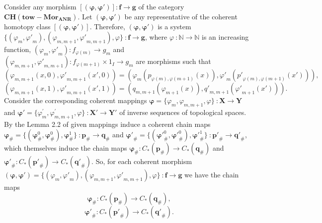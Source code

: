 \documentclass[10pt]{article}
\theoremstyle{definition}
\begin{document}
Consider any morphism $\left[ ( \mathbf{\varphi },\mathbf{{\varphi }'} ) \right]:\mathbf{f}\to \mathbf{g}$ of the category $\mathbf{CH}( \mathbf{tow}-\mathbf{Mo}{{\mathbf{r}}_{\mathbf{ANR}}} ).$ Let $( \mathbf{\varphi },\mathbf{{\varphi }'} )$ be any representative of the coherent homotopy class $\left[ ( \mathbf{\varphi },\mathbf{{\varphi }'} ) \right]$. Therefore, $( \mathbf{\varphi },\mathbf{{\varphi }'} )$ is a system $\{ ( {{\varphi }_{m}},{\varphi'} _{m}),( {{\varphi }_{m,m+1}},{\varphi '} _{m,m+1} ),\varphi  \}~:\mathbf{f}\to \mathbf{g}$, where $\varphi ~: \mathbb{N} \to \mathbb{N}$ is an increasing function, $( {{\varphi }_{m}},{\varphi'} _{m} ):{{f}_{\varphi ( m )}}\to {{g}_{m}}$ and $( {{\varphi }_{m,m+1}},{\varphi'} _{m,m+1} ):{{f}_{\varphi ( m+1 )}}\times {{1}_{I}}\to {{g}_{m}}$ are  morphisms such that 
$$( {{\varphi }_{m,m+1}}( x,0 ),{{\varphi}'}_{m,m+1}( {x}',0 ) )=( {{\varphi }_{m}}( {{p}_{\varphi ( m ),\varphi ( m+1 )}}( x ) ),{{\varphi}'} _{m}( {p'}_{\varphi ( m ),\varphi ( m+1 )}( {{x}'} ) ) ),$$ 
$$( {{\varphi }_{m,m+1}}( x,1 ),{{\varphi}'} _{m,m+1}( {x}',1 ) )=( {{q}_{m,m+1}}( {{\varphi }_{m+1}}( x ) ),{q'}_{m,m+1}( {{\varphi}'} _{m+1}( {{x}'} ) ) ).$$            
Consider the corresponding coherent mappings $\mathbf {\varphi }=\{ {{\varphi }_{m}},{{\varphi }_{m,m+1}},\varphi  \}~:\mathbf{X}\to \mathbf{Y}$ and $\mathbf{{\varphi }'}= \{ \varphi _{m}^{'},\varphi _{m,m+1}^{'},\varphi  \}~:\mathbf{{X}'}\to \mathbf{{Y}' }$ of inverse sequences of topological spaces. By the Lemma 2.2 of  \cite{1901}  given mappings induce  a coherent chain maps ${{\mathbf{\varphi }}_{\#}}= \{ ( \mathbf{\varphi }_{\#}^{0},\mathbf{\varphi }_{\#}^{0} ),\mathbf{\varphi }_{\#}^{1} \}~:{{\mathbf{p}}_{\#}}\to {{\mathbf{q}}_{\#}}$ and ${{\mathbf{\varphi' }}_{\#}}= \{ ( \mathbf{\varphi' }_{\#}^{0},\mathbf{\varphi' }_{\#}^{0} ),\mathbf{\varphi' }_{\#}^{1} \}~:{{\mathbf{p'}}_{\#}}\to {{\mathbf{q'}}_{\#}}$, which themselves  induce the chain maps  ${{\mathbf{\varphi }}_{\#}}:{{C}_{*}}( {{\mathbf{p}}_{\#}} )\to {{C}_{*}}( {{\mathbf{q}}_{\#}} )$ and ${{\mathbf{\varphi' }}_{\#}}:{{C}_{*}}( {{\mathbf{p'}}_{\#}} )\to {{C}_{*}}( {{\mathbf{q'}}_{\#}} )$. So, for each coherent morphism $( \mathbf{\varphi },\mathbf{{\varphi' }} )= \{ ( {{\varphi }_{m}},{{\varphi'}} _{m} ),( {{\varphi }_{m,m+1}},{{\varphi}'} _{m,m+1} ),\varphi  \}~:\mathbf{f}\to \mathbf{g}$ we have the chain maps
$${{\mathbf{\varphi }}_{\#}}:{{C}_{*}}( {{\mathbf{p}}_{\#}} )\to {{C}_{*}}( {{\mathbf{q}}_{\#}} ) ,$$                              
$$\mathbf{\varphi' }_{\#}:{{C}_{*}}( \mathbf{p'}_{\#} )\to {{C}_{*}}( \mathbf{q'}_{\#} ) .$$                              
\end{document}
